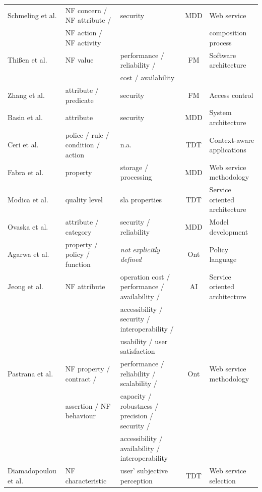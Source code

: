 \documentclass{sig-alternate}
\begin{document}
\begin{table}[ht!]
\begin{tabular}{l|l|l|c|l}
  \hline
  Schmeling et al. \cite{SchmelingCM11} & NF concern / NF attribute /& security &
  MDD &  Web service 
  \\
  & NF action / NF activity &  &
   & composition process
  \\ 
  \hline
    Thi{\ss}en et al. \cite{ThissenW06} & NF value  &  performance /
  reliability / &  FM & Software architecture \\  
   & & cost / availability &  & \\  
  \hline
  Zhang et al. \cite{ZhangPSP05} & attribute / predicate & security & FM &  Access control 
   \\
  \hline
  Basin et al. \cite{BasinDL06} &  attribute & security  & MDD & System
  architecture
  \\
  \hline
  Ceri et al. \cite{CeriDMF07} & police / rule / condition / action & n.a. & TDT & Context-aware
  applications
  \\
  \hline
  Fabra et al. \cite{Fabra2011} & property & storage /
  processing & MDD & Web service methodology 
  \\
  \hline
  Modica et al. \cite{ModicaTV09} & quality level & sla
  properties & TDT &  Service oriented architecture
  \\
  \hline
  Ovaska et al. \cite{OvaskaEHPA10} & attribute / category & security / reliability
  & MDD &  Model development
  \\
  \hline
  Agarwa et al. \cite{AgarwalLS09} & property / policy / function & \textit{not explicitly
  defined} & Ont & Policy language
  \\
  \hline
  Jeong et al. \cite{JeongCL09} & NF attribute & operation cost / performance / availability /& AI & Service oriented architecture\\
  &  &  accessibility / security / interoperability / &  &  \\
   &  & usability / user satisfaction & &
\\
  \hline
 Pastrana et al. \cite{PastranaPK11}  & NF property / contract  / & performance / reliability / scalability / & Ont & Web service methodology\\
   &assertion / NF behaviour &  capacity / robustness / precision / security /&  & \\
  &  & accessibility / availability / interoperability    &  & \\    
  \hline
  Diamadopoulou et al. \cite{DiamadopoulouMPS08} & NF characteristic &
  user' subjective perception & TDT & Web service selection  \\ 

\end{tabular}
\end{table}
\end{document}
